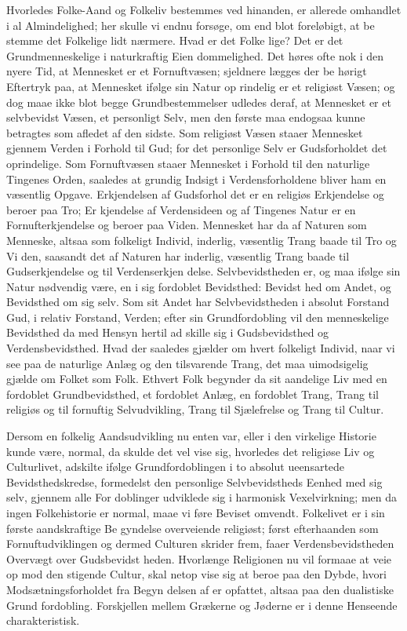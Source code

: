 \documentclass[12pt]{book}
\newcommand{\opage}[1]{\marginnote{\footnotesize\textit{[#1]}}}
\begin{document}
Hvorledes Folke-Aand og Folkeliv bestemmes ved
hinanden, er allerede omhandlet i al Almindelighed; her
skulle vi endnu forsøge, om end blot foreløbigt, at be\-%
stemme det Folkelige lidt nærmere. Hvad er det Folke\-%
lige? Det er det Grundmenneskelige i naturkraftig Eien\-%
dommelighed. Det høres ofte nok i den nyere Tid, at
Mennesket er et Fornuftvæsen; sjeldnere lægges der be\-%
hørigt Eftertryk paa, at Mennesket ifølge sin Natur op\-%
rindelig er et religiøst Væsen; og dog maae ikke blot
begge Grundbestemmelser udledes deraf, at Mennesket
er et selvbevidst Væsen, et personligt Selv, men den
første maa endogsaa kunne betragtes som afledet af den
sidste. Som religiøst Væsen staaer Mennesket gjennem
Verden i Forhold til Gud; for det personlige Selv er
Gudsforholdet det oprindelige. Som Fornuftvæsen staaer
Mennesket i Forhold til den naturlige Tingenes Orden,
saaledes at grundig Indsigt i Verdensforholdene bliver
ham en væsentlig Opgave. Erkjendelsen af Gudsforhol\-%
det er en religiøs Erkjendelse og beroer paa Tro; Er\-%
kjendelse af Verdensideen og af Tingenes Natur er en
Fornufterkjendelse og beroer paa Viden. Mennesket
har da af Naturen som Menneske, altsaa som folkeligt
Individ, inderlig, væsentlig Trang baade til Tro og Vi\-%
den, saasandt det af Naturen har inderlig, væsentlig
Trang baade til Gudserkjendelse og til Verdenserkjen\-%
\opage{48}\setcounter{footnote}{0}%
delse. Selvbevidstheden er, og maa ifølge sin Natur
nødvendig være, en i sig fordoblet Bevidsthed: Bevidst\-%
hed om Andet, og Bevidsthed om sig selv. Som sit
Andet har Selvbevidstheden i absolut Forstand Gud, i
relativ Forstand, Verden; efter sin Grundfordobling vil
den menneskelige Bevidsthed da med Hensyn hertil ad\-%
skille sig i Gudsbevidsthed og Verdensbevidsthed. Hvad
der saaledes gjælder om hvert folkeligt Individ, naar vi
see paa de naturlige Anlæg og den tilsvarende Trang, det
maa uimodsigelig gjælde om Folket som Folk. Ethvert
Folk begynder da sit aandelige Liv med en fordoblet
Grundbevidsthed, et fordoblet Anlæg, en fordoblet Trang,
Trang til religiøs og til fornuftig Selvudvikling, Trang til
Sjælefrelse og Trang til Cultur.

Dersom en folkelig Aandsudvikling nu enten var,
eller i den virkelige Historie kunde være, normal, da
skulde det vel vise sig, hvorledes det religiøse Liv og
Culturlivet, adskilte ifølge Grundfordoblingen i to absolut
ueensartede Bevidsthedskredse, formedelst den personlige
Selvbevidstheds Eenhed med sig selv, gjennem alle For\-%
doblinger udviklede sig i harmonisk Vexelvirkning; men
da ingen Folkehistorie er normal, maae vi føre Beviset
omvendt. Folkelivet er i sin første aandskraftige Be\-%
gyndelse overveiende religiøst; først efterhaanden som
Fornuftudviklingen og dermed Culturen skrider frem,
faaer Verdensbevidstheden Overvægt over Gudsbevidst\-%
heden. Hvorlænge Religionen nu vil formaae at veie op
mod den stigende Cultur, skal netop vise sig at beroe
paa den Dybde, hvori Modsætningsforholdet fra Begyn\-%
delsen af er opfattet, altsaa paa den dualistiske Grund\-%
fordobling. Forskjellen mellem Grækerne og Jøderne
er i denne Henseende charakteristisk.
\end{document}
